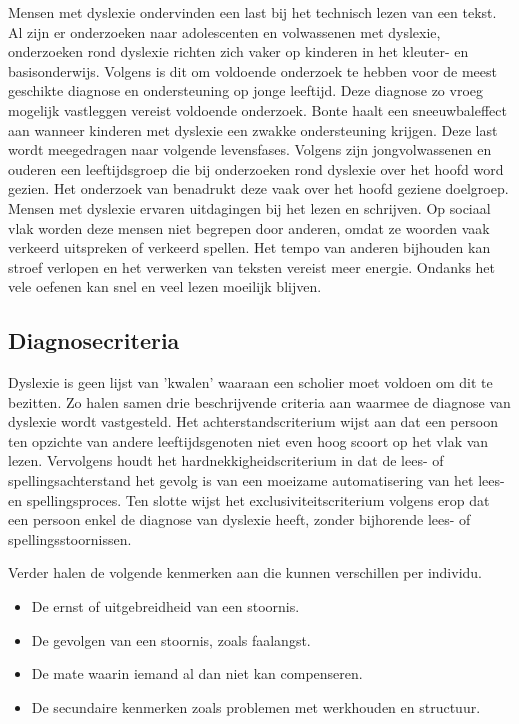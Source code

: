 Mensen met dyslexie ondervinden een last bij het technisch lezen van een tekst. Al zijn er onderzoeken naar adolescenten en volwassenen met dyslexie, onderzoeken rond dyslexie richten zich vaker op kinderen in het kleuter- en basisonderwijs. Volgens \textcite{Bonte2020} is dit om voldoende onderzoek te hebben voor de meest geschikte diagnose en ondersteuning op jonge leeftijd. Deze diagnose zo vroeg mogelijk vastleggen vereist voldoende onderzoek. Bonte haalt een sneeuwbaleffect aan wanneer kinderen met dyslexie een zwakke ondersteuning krijgen. Deze last wordt meegedragen naar volgende levensfases. Volgens \textcite{Lissens2020} zijn jongvolwassenen en ouderen een leeftijdsgroep die bij onderzoeken rond dyslexie over het hoofd word gezien. Het onderzoek van \textcite{Lissens2020} benadrukt deze vaak over het hoofd geziene doelgroep. Mensen met dyslexie ervaren uitdagingen bij het lezen en schrijven. Op sociaal vlak worden deze mensen niet begrepen door anderen, omdat ze woorden vaak verkeerd uitspreken of verkeerd spellen. Het tempo van anderen bijhouden kan stroef verlopen en het verwerken van teksten vereist meer energie. Ondanks het vele oefenen kan snel en veel lezen moeilijk blijven. 

\subsection{Diagnosecriteria}

Dyslexie is geen lijst van 'kwalen' waaraan een scholier moet voldoen om dit te bezitten. Zo halen \textcite{Kleijnen2008, Ghesquiere2018} samen drie beschrijvende criteria aan waarmee de diagnose van dyslexie wordt vastgesteld. Het achterstandscriterium wijst aan dat een persoon ten opzichte van andere leeftijdsgenoten niet even hoog scoort op het vlak van lezen. Vervolgens houdt het hardnekkigheidscriterium in dat de lees- of spellingsachterstand het gevolg is van een moeizame automatisering van het lees- en spellingsproces. Ten slotte wijst het exclusiviteitscriterium volgens \textcite{Ghesquiere2018} erop dat een persoon enkel de diagnose van dyslexie heeft, zonder bijhorende lees- of spellingsstoornissen. 

Verder halen \textcite{VanVreckem2015, Ghesquiere2018} de volgende kenmerken aan die kunnen verschillen per individu.

\begin{itemize}
	\item De ernst of uitgebreidheid van een stoornis.
	\item De gevolgen van een stoornis, zoals faalangst.
	\item De mate waarin iemand al dan niet kan compenseren.
	\item De secundaire kenmerken zoals problemen met werkhouden en structuur.
\end{itemize}


